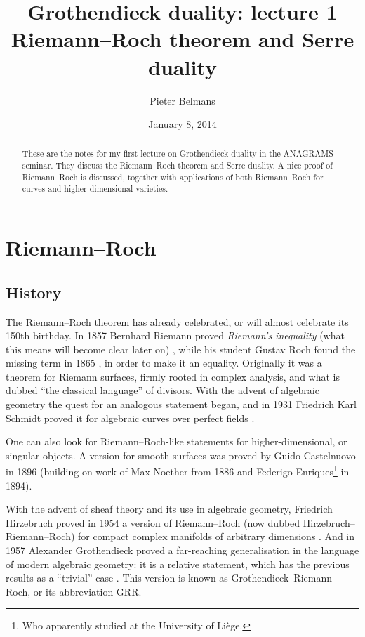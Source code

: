 \documentclass[10pt,a4paper]{article}
\title{Grothendieck duality: lecture 1 \\[.2em] \Large Riemann--Roch theorem and Serre duality}
\author{Pieter Belmans}
\date{January 8, 2014}
\theoremstyle{lecture}
\begin{document}
\maketitle

\begin{abstract}
  These are the notes for my first lecture on Grothendieck duality in the ANAGRAMS seminar. They discuss the Riemann--Roch theorem and Serre duality. A nice proof of Riemann--Roch is discussed, together with applications of both Riemann--Roch for curves and higher-dimensional varieties.
\end{abstract}

\tableofcontents

\clearpage

\section{Riemann--Roch}
\label{section:riemann-roch}
\subsection{History}
\label{subsection:riemann-roch-history}
The Riemann--Roch theorem has already celebrated, or will almost celebrate its 150th birthday. In 1857 Bernhard Riemann proved \emph{Riemann's inequality} (what this means will become clear later on) \cite{riemann-abelschen-funktionen}, while his student Gustav Roch found the missing term in 1865 \cite{roch-ueber-die-anzahl}, in order to make it an equality. Originally it was a theorem for Riemann surfaces, firmly rooted in complex analysis, and what is dubbed ``the classical language'' of divisors. With the advent of algebraic geometry the quest for an analogous statement began, and in 1931 Friedrich Karl Schmidt proved it for algebraic curves over perfect fields \cite{schmidt-zaehlentheorie}.

One can also look for Riemann--Roch-like statements for higher-dimensional, or singular objects. A version for smooth surfaces was proved by Guido Castelnuovo in 1896 (building on work of Max Noether from 1886 and Federigo Enriques\footnote{Who apparently studied at the University of Li\`ege.} in 1894). 

With the advent of sheaf theory and its use in algebraic geometry, Friedrich Hirzebruch proved in 1954 a version of Riemann--Roch (now dubbed Hirzebruch--Riemann--Roch) for compact complex manifolds of arbitrary dimensions \addreference. And in 1957 Alexander Grothendieck proved a far-reaching generalisation in the language of modern algebraic geometry: it is a relative statement, which has the previous results as a ``trivial'' case \addreference. This version is known as Grothendieck--Riemann--Roch, or its abbreviation GRR.
\end{document}
